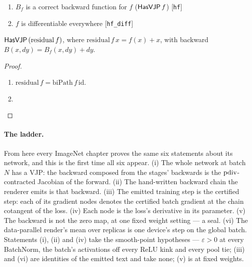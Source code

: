 \begin{theorem}
  \label{thm:residualHasVJP}
  \leanok
  \Assume{}
  \begin{enumerate}
    \item \(B_f\) is a correct backward function for \(f\)
          (\(\mathsf{HasVJP}\, f\)) \hfill[\texttt{hf}]
    \item \(f\) is differentiable everywhere \hfill[\texttt{hf\_diff}]
  \end{enumerate}
  \Prove{} \(\mathsf{HasVJP}\, (\mathrm{residual}\, f)\), where
  \(\mathrm{residual}\, f\, x = f(x) + x\), with backward
  \(B(x, dy) = B_f(x, dy) + dy\).
\end{theorem}

\begin{proof}
\leanok
\begin{enumerate}
  \item \(\mathrm{residual}\, f = \mathrm{biPath}\, f\, \mathrm{id}\).
  \item \Qed{}
\end{enumerate}
\end{proof}

\paragraph{The ladder.}
From here every ImageNet chapter proves the same six statements about its
network, and this is the first time all six appear. (i) The whole network at
batch \(N\) has a VJP: the backward composed from the stages' backwards is the
\(\operatorname{pdiv}\)-contracted Jacobian of the forward. (ii) The hand-written backward
chain the renderer emits is that backward. (iii) The emitted training step is
the certified step: each of its gradient nodes denotes the certified batch
gradient at the chain cotangent of the loss. (iv) Each node is the loss's
derivative in its parameter. (v) The backward is not the zero map, at one
fixed weight setting --- a seal. (vi) The data-parallel render's mean over
replicas is one device's step on the global batch. Statements (i), (ii) and
(iv) take the smooth-point hypotheses --- \(\varepsilon > 0\) at every
BatchNorm, the batch's activations off every ReLU kink and every pool tie;
(iii) and (vi) are identities of the emitted text and take none; (v) is at
fixed weights.

